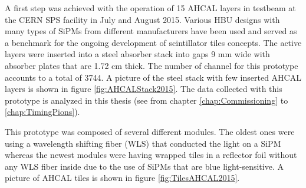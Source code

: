 A first step was achieved with the operation of 15 AHCAL layers in testbeam at the CERN SPS facility in July and August 2015. Various HBU designs with many types of SiPMs from different manufacturers have been used and served as a benchmark for the ongoing development of scintillator tiles concepts. The active layers were inserted into a steel absorber stack into gaps 9 mm wide with absorber plates that are 1.72 cm thick. The number of channel for this prototype accounts to a total of 3744. A picture of the steel stack with few inserted AHCAL layers is shown in figure \ref{fig:AHCALStack2015}. The data collected with this prototype is analyzed in this thesis (see from chapter \ref{chap:Commissioning} to \ref{chap:TimingPions}).

This prototype was composed of several different modules. The oldest ones were using a wavelength shifting fiber (WLS) that conducted the light on a SiPM whereas the newest modules were having wrapped tiles in a reflector foil without any WLS fiber inside due to the use of SiPMs that are blue light-sensitive. A picture of AHCAL tiles is shown in figure \ref{fig:TilesAHCAL2015}.


